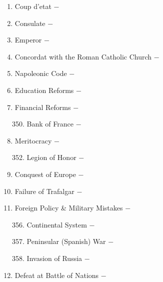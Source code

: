 \documentclass[12pt]{article}
\begin{document}
\begin{enumerate}
\item Coup d'etat $-$ 

\item Consulate $-$ 

\item Emperor $-$ 

\item Concordat with the Roman Catholic Church $-$ 

\item Napoleonic Code $-$ 

\item Education Reforms $-$ 

\item Financial Reforms $-$ 


\begin{enumerate}[label=\arabic{*}.]
\setcounter{enumii}{349}

\item Bank of France $-$

\end{enumerate}
\setcounter{enumi}{350}

\item Meritocracy $-$ 

\begin{enumerate}[label=\arabic{*}.]
\setcounter{enumii}{351}

\item Legion of Honor $-$ 

\end{enumerate}
\setcounter{enumi}{352}

\item Conquest of Europe $-$ 

\item Failure of Trafalgar $-$ 

\item Foreign Policy \& Military Mistakes $-$ 

\begin{enumerate}[label=\arabic{*}.]
\setcounter{enumii}{355}

\item Continental System $-$

\item Peninsular (Spanish) War $-$

\item Invasion of Russia $-$ 

\end{enumerate}
\setcounter{enumi}{358}

\item Defeat at Battle of Nations $-$ 


\end{enumerate}
\end{document}
